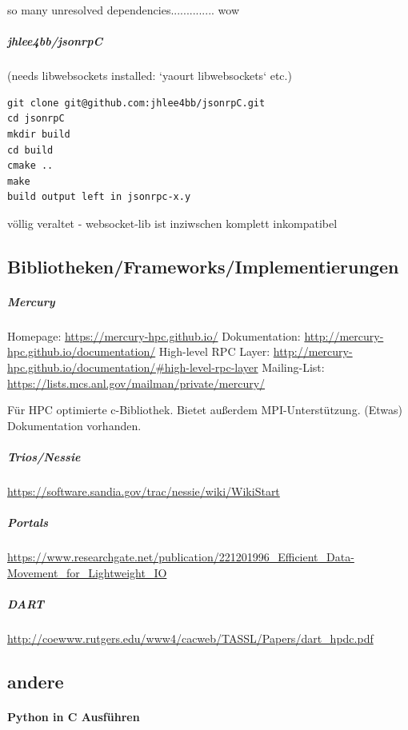 \documentclass[a4paper,10pt]{article}
\begin{document}
so many unresolved dependencies.............. wow

\subparagraph{jhlee4bb/jsonrpC}

(needs libwebsockets installed: `yaourt libwebsockets` etc.)

\begin{lstlisting}[frame=single,caption=jhlee4bb/jsonrpC Installation]
git clone git@github.com:jhlee4bb/jsonrpC.git
cd jsonrpC
mkdir build
cd build
cmake ..
make
build output left in jsonrpc-x.y
\end{lstlisting}

völlig veraltet - websocket-lib ist inziwschen komplett inkompatibel


\subsection{Bibliotheken/Frameworks/Implementierungen}

\subparagraph{Mercury}

Homepage: \url{https://mercury-hpc.github.io/}
Dokumentation: \url{http://mercury-hpc.github.io/documentation/}
High-level RPC Layer: \url{http://mercury-hpc.github.io/documentation/#high-level-rpc-layer}
Mailing-List: \url{https://lists.mcs.anl.gov/mailman/private/mercury/}

Für HPC optimierte c-Bibliothek.
Bietet außerdem MPI-Unterstützung.
(Etwas) Dokumentation vorhanden.

\subparagraph{Trios/Nessie}

\url{https://software.sandia.gov/trac/nessie/wiki/WikiStart}

\subparagraph{Portals}

\url{https://www.researchgate.net/publication/221201996_Efficient_Data-Movement_for_Lightweight_IO}

\subparagraph{DART}

\url{http://coewww.rutgers.edu/www4/cacweb/TASSL/Papers/dart_hpdc.pdf}

\subsection{andere}

\paragraph{Python in C Ausführen}
\end{document}
